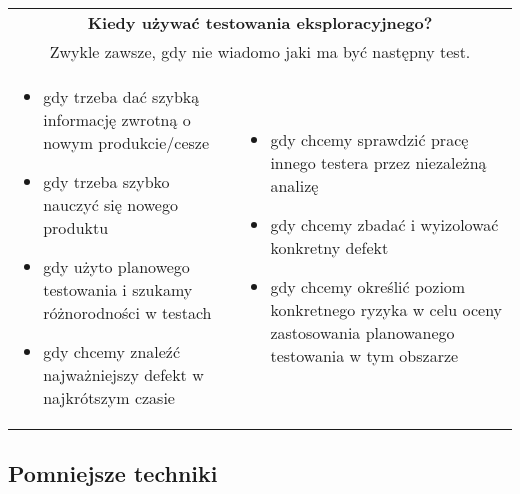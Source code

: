 \documentclass[../main.tex]{subfiles}
\begin{document}
    \begin{table}[H]
        \begin{center}
            \begin{tabular}{p{8cm} p{8cm}}
                \multicolumn{2}{c}{\textbf{Kiedy używać testowania eksploracyjnego?}} \\
                \multicolumn{2}{c}{Zwykle zawsze, gdy nie wiadomo jaki ma być następny test.} \\
                \begin{itemize}
                    \item gdy trzeba dać szybką informację zwrotną o nowym produkcie/cesze
                    \item gdy trzeba szybko nauczyć się nowego produktu
                    \item gdy użyto planowego testowania i szukamy różnorodności w testach
                    \item gdy chcemy znaleźć najważniejszy defekt w najkrótszym czasie
                \end{itemize}
                &
                \begin{itemize}
                    \item gdy chcemy sprawdzić pracę innego testera przez niezależną analizę
                    \item gdy chcemy zbadać i wyizolować konkretny defekt
                    \item gdy chcemy określić poziom konkretnego ryzyka w celu oceny zastosowania planowanego testowania w tym obszarze
                \end{itemize}
            \end{tabular}
        \end{center}
    \end{table}

    \subsection{Pomniejsze techniki}
\end{document}
